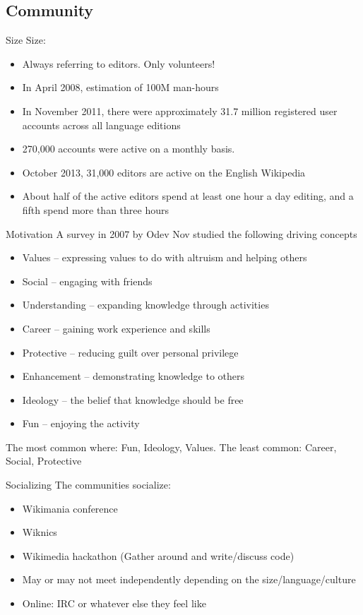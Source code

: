 \documentclass{beamer}
\begin{document}
\subsection{Community}
\begin{frame}{Size}
	Size:
	\begin{itemize}
		\pause \item Always referring to editors. Only volunteers!
		\pause \item In April 2008, estimation of 100M man-hours
		\pause \item In November 2011, there were approximately 31.7 million registered user accounts across all language editions
		\pause \item 270,000 accounts were active on a monthly basis.
		\pause \item October 2013, 31,000 editors are active on the English Wikipedia
		\pause \item About half of the active editors spend at least one hour a day editing, and a fifth spend more than three hours
	\end{itemize}
\end{frame}
\begin{frame}{Motivation}
	A survey in 2007 by Odev Nov studied the following driving concepts
	\begin{itemize}
		\pause \item Values – expressing values to do with altruism and helping others
		\pause \item Social – engaging with friends
		\pause \item Understanding – expanding knowledge through activities
		\pause \item Career – gaining work experience and skills
		\pause \item Protective – reducing guilt over personal privilege
		\pause \item Enhancement – demonstrating knowledge to others
		\pause \item Ideology – the belief that knowledge should be free
		\pause \item Fun – enjoying the activity
	\end{itemize}
	\pause The most common where: Fun, Ideology, Values. The least common: Career, Social, Protective
\end{frame}
\begin{frame}{Socializing}
	The communities socialize:
	\begin{itemize}
		\pause \item Wikimania conference
		\pause \item Wiknics
		\pause \item Wikimedia hackathon (Gather around and write/discuss code)
		\pause \item May or may not meet independently depending on the size/language/culture
		\pause \item Online: IRC or whatever else they feel like
	\end{itemize}
\end{frame}
\end{document}
